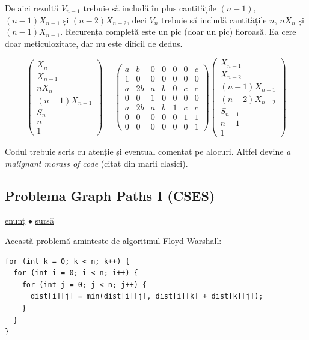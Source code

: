 \documentclass[../main.tex]{subfiles}
\begin{document}
De aici rezultă $V_{n-1}$ trebuie să includă în plus cantitățile $(n-1)$, $(n-1) X_{n-1}$ și $(n-2) X_{n-2}$, deci $V_{n}$ trebuie să includă cantitățile $n$, $n X_n$ și $(n-1) X_{n-1}$. Recurența completă este un pic (doar un pic) fioroasă. Ea cere doar meticulozitate, dar nu este dificil de dedus.

$$
\begin{pmatrix}
  X_n \\ X_{n-1} \\ n X_n \\ (n-1) X_{n-1} \\ S_n \\ n \\ 1
\end{pmatrix}
=
\begin{pmatrix}
  a & b & 0 & 0 & 0 & 0 & c\\
  1 & 0 & 0 & 0 & 0 & 0 & 0\\
  a & 2b & a & b & 0 & c & c\\
  0 & 0 & 1 & 0 & 0 & 0 & 0\\
  a & 2b & a & b & 1 & c & c\\
  0 & 0 & 0 & 0 & 0 & 1 & 1\\
  0 & 0 & 0 & 0 & 0 & 0 & 1
\end{pmatrix}
\begin{pmatrix}
  X_{n-1} \\ X_{n-2} \\ (n-1) X_{n-1} \\ (n-2) X_{n-2} \\ S_{n-1} \\ n-1 \\ 1
\end{pmatrix}
$$

Codul trebuie scris cu atenție și eventual comentat pe alocuri. Altfel devine \textit{a malignant morass of code} (citat din marii clasici).

\subsection{Problema Graph Paths I (CSES)}
\label{problem:graph-paths-1}

\href{https://cses.fi/problemset/task/1723}{enunț}
$\bullet$
\hyperref[code:graph-paths-1]{sursă}

Această problemă amintește de algoritmul Floyd-Warshall:

\begin{verbatim}
for (int k = 0; k < n; k++) {
  for (int i = 0; i < n; i++) {
    for (int j = 0; j < n; j++) {
      dist[i][j] = min(dist[i][j], dist[i][k] + dist[k][j]);
    }
  }
}
\end{verbatim}
\end{document}
